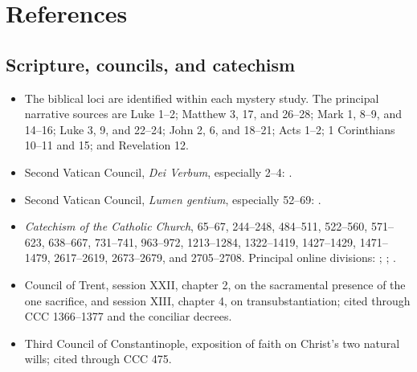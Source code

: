 \section{References}

\begingroup
\footnotesize
\setlength{\parskip}{0pt}

\subsection{Scripture, councils, and catechism}

\begin{itemize}
  \item The biblical loci are identified within each mystery study. The principal narrative sources are Luke 1--2; Matthew 3, 17, and 26--28; Mark 1, 8--9, and 14--16; Luke 3, 9, and 22--24; John 2, 6, and 18--21; Acts 1--2; 1 Corinthians 10--11 and 15; and Revelation 12.
  \item Second Vatican Council, \emph{Dei Verbum}, especially 2--4: .
  \item Second Vatican Council, \emph{Lumen gentium}, especially 52--69: .
  \item \emph{Catechism of the Catholic Church}, 65--67, 244--248, 484--511, 522--560, 571--623, 638--667, 731--741, 963--972, 1213--1284, 1322--1419, 1427--1429, 1471--1479, 2617--2619, 2673--2679, and 2705--2708. Principal online divisions: ; ; .
  \item Council of Trent, session XXII, chapter 2, on the sacramental presence of the one sacrifice, and session XIII, chapter 4, on transubstantiation; cited through CCC 1366--1377 and the conciliar decrees.
  \item Third Council of Constantinople, exposition of faith on Christ's two natural wills; cited through CCC 475.
\end{itemize}

